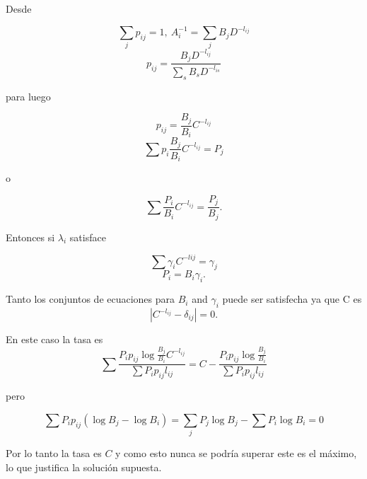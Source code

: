 \begin{appendices}
Desde

\begin{equation}
\sum _{j}p_{ij}=1,\ A_{i}^{-1}=\sum_{j}B_{j}D^{-l_{ij}}
\end{equation}
\begin{equation}
p_{ij}=\frac{B_{j}D^{-l_{ij}}}{\sum_{s}B_{s}D^{-l_{is}}}
\end{equation}

para luego

\begin{equation}
p_{ij}=\frac{B_{j}}{B_{i}}C^{-l_{ij}}
\end{equation}
\begin{equation}
\sum p_{i}\frac{B_{j}}{B_{i}}C^{-l_{ij}}=P_{j}
\end{equation}

o

\begin{equation}
\sum \frac{P_{i}}{B_{i}}C^{-l_{ij}}=\frac {P_{j}}{B_{j}}.
\end{equation}

Entonces si $\lambda_{i}$ satisface

\begin{equation}
\sum\gamma _{i}C^{-lij}=\gamma_{j}
\end{equation}
\begin{equation}
P_{i}=B_{i}\gamma _{i}.
\end{equation}

Tanto los conjuntos de ecuaciones para $B_{i}$ and $\gamma_{i}$ puede ser satisfecha ya 
que C es
\begin{equation}
\left | C^{-l_{ij}} - \delta _{ij}\right |=0.
\end{equation}

En este caso la tasa es
\begin{equation}
\sum \frac{P_{i}p_{ij}\log \frac{B_{j}}{B_{i}}C^{-l_{ij}}}{\sum P_{i}p_{ij}l_{ij}}=C-\frac{P_{i}p_{ij}\log \frac{B_{j}}{B_{i}}}{\sum P_{i}p_{ij}l_{ij}}
\end{equation}

pero

\begin{equation}
\sum P_{i}p_{ij}(\log B_{j}-\log B_{i})=\sum_{j}P_{j}\log B_{j}-\sum P_{i}\log B_{i}=0
\end{equation}

Por lo tanto la tasa es $C$ y como esto nunca se podr\'ia superar este es el 
m\'aximo, lo que justifica la soluci\'on supuesta.

\end{appendices}
